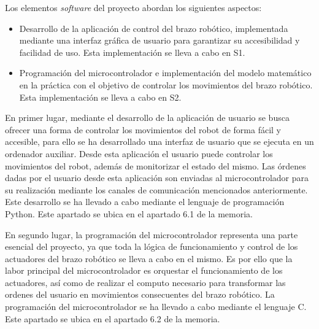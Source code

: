 Los elementos \textit{software} del proyecto abordan los siguientes aspectos:

\begin{itemize}
    \item Desarrollo de la aplicación de control del brazo robótico, implementada mediante una interfaz gráfica de usuario para garantizar su accesibilidad y facilidad de uso. Esta implementación se lleva a cabo en S1.
    \item Programación del microcontrolador e implementación del modelo matemático en la práctica con el objetivo de controlar los movimientos del brazo robótico. Esta implementación se lleva a cabo en S2.
\end{itemize}

En primer lugar, mediante el desarrollo de la aplicación de usuario se busca ofrecer una forma de controlar los movimientos del robot de forma fácil y accesible, para ello se ha desarrollado una interfaz de usuario que se ejecuta en un ordenador auxiliar. Desde esta aplicación el usuario puede controlar los movimientos del robot, además de monitorizar el estado del mismo. Las órdenes dadas por el usuario desde esta aplicación son enviadas al microcontrolador para su realización mediante los canales de comunicación mencionados anteriormente. Este desarrollo se ha llevado a cabo mediante el lenguaje de programación Python. Este apartado se ubica en el apartado 6.1 de la memoria.

En segundo lugar, la programación del microcontrolador representa una parte esencial del proyecto, ya que toda la lógica de funcionamiento y control de los actuadores del brazo robótico se lleva a cabo en el mismo. Es por ello que la labor principal del microcontrolador es orquestar el funcionamiento de los actuadores, así como de realizar el computo necesario para transformar las ordenes del usuario en movimientos consecuentes del brazo robótico. La programación del microcontrolador se ha llevado a cabo mediante el lenguaje C. Este apartado se ubica en el apartado 6.2 de la memoria.
